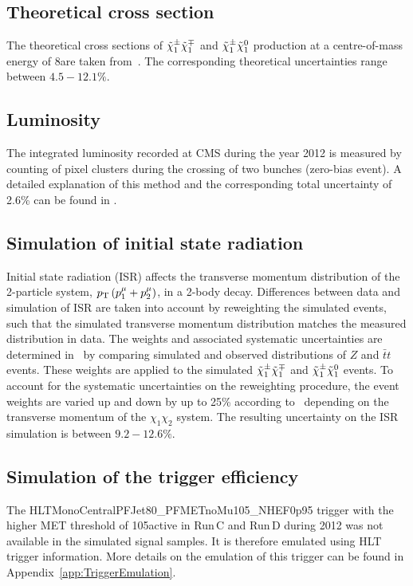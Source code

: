 \subsection*{Theoretical cross section}
The theoretical cross sections of $\tilde{\chi}^{\pm}_{1}\tilde{\chi}^{\mp}_{1}$ and $\tilde{\chi}^{\pm}_{1}\tilde{\chi}^{0}_{1}$ production at a centre-of-mass energy of 8\tev are taken from~\cite{bib:SignalCrossSection_2012,bib:SignalCrossSection_2013}.
The corresponding theoretical uncertainties range between $4.5-12.1\%$.

\subsection*{Luminosity}
The integrated luminosity recorded at CMS during the year 2012 is measured by counting of pixel clusters during the crossing of two bunches (zero-bias event).
A detailed explanation of this method and the corresponding total uncertainty of 2.6\% can be found in \cite{bib:CMS:Lumi_PAS}.

\subsection*{Simulation of initial state radiation}
Initial state radiation (ISR) affects the transverse momentum distribution of the 2-particle system, $p_{\text{T}}\left(p_1^{\mu} + p_2^{\mu} \right)$, in a 2-body decay.
Differences between data and simulation of ISR are taken into account by reweighting the simulated events, such that the simulated transverse momentum distribution matches the measured distribution in data. 
The weights and associated systematic uncertainties are determined in~\cite{bib:CMS:ISR_AN} by comparing simulated and observed \pt distributions of $Z$ and $\bar{t}t$ events.
These weights are applied to the simulated $\tilde{\chi}^{\pm}_{1}\tilde{\chi}^{\mp}_{1}$ and $\tilde{\chi}^{\pm}_{1}\tilde{\chi}^{0}_{1}$ events.
To account for the systematic uncertainties on the reweighting procedure, the event weights are varied up and down by up to 25\% according to~\cite{bib:CMS:ISR_AN} depending on the transverse momentum of the $\chi_1\chi_2$ system.
The resulting uncertainty on the ISR simulation is between $9.2-12.6\%$.

\subsection*{Simulation of the trigger efficiency}
The HLTMonoCentralPFJet80\_PFMETnoMu105\_NHEF0p95 trigger with the higher MET threshold of 105\gev active in Run\,C and Run\,D during 2012 was not available in the simulated signal samples.
It is therefore emulated using HLT trigger information. 
More details on the emulation of this trigger can be found in Appendix~\ref{app:TriggerEmulation}.

